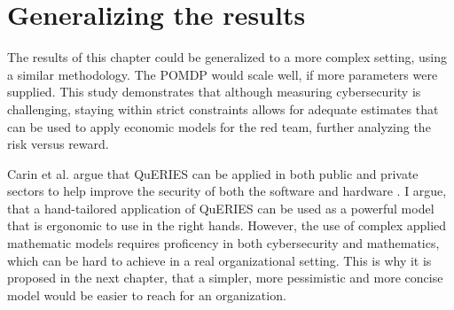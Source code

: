 \section{Generalizing the results}

The results of this chapter could be generalized to a more complex
setting, using a similar methodology. The POMDP would scale well, if
more parameters were supplied. This study demonstrates that although
measuring cybersecurity is challenging, staying within strict
constraints allows for adequate estimates that can be used to apply
economic models for the red team, further analyzing the risk versus
reward.
 
Carin et al. argue that QuERIES can be
applied in both public and private sectors to help improve the
security of both the software and hardware \cite{carin2008cybersecurity}. I argue, that a hand-tailored
application of QuERIES can be used as a powerful model that is
ergonomic to use in the right hands. However, the use of complex
applied mathematic models requires proficency in both cybersecurity and
mathematics, which can be hard to achieve in a real organizational
setting. This is why it is proposed in the next chapter, that a simpler, more pessimistic and more concise model would be easier to reach for an
organization.
